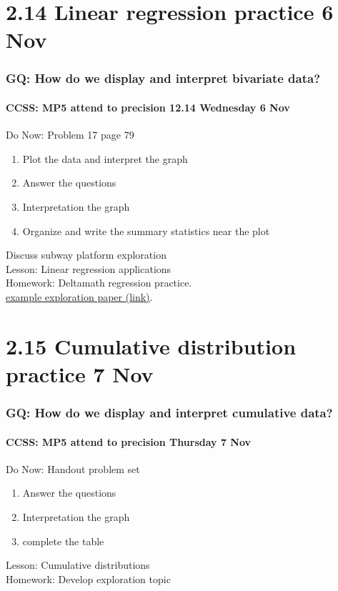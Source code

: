 \documentclass{beamer}
\begin{document}
\section{2.14 Linear regression practice 6 Nov}
\frame
{
  \frametitle{GQ: How do we display and interpret bivariate data?}
  \framesubtitle{CCSS: MP5 attend to precision \hfill \alert{12.14 Wednesday 6 Nov}}

  \begin{block}{Do Now: Problem 17 page 79}
  \begin{enumerate}
    \item Plot the data and interpret the graph 
    \item Answer the questions
    \item Interpretation the graph
    \item Organize and write the summary statistics near the plot
  \end{enumerate}
  \end{block}
  Discuss subway platform exploration \\ \smallskip
  Lesson: Linear regression applications\\ \smallskip
  Homework: Deltamath regression practice. \\ 
  \href{https://docs.google.com/viewer?a=v&pid=sites&srcid=ZGVmYXVsdGRvbWFpbnxodXNvbmJlY2F8Z3g6NzRkYjQ2MzQ5MDNmMDUxMA}
{example exploration paper (link)}. 
}

\section{2.15 Cumulative distribution practice 7 Nov}
\frame
{
  \frametitle{GQ: How do we display and interpret cumulative data?}
  \framesubtitle{CCSS: MP5 attend to precision \hfill \alert{Thursday 7 Nov}}

  \begin{block}{Do Now: Handout problem set}
  \begin{enumerate}
      \item Answer the questions 
      \item Interpretation the graph
      \item complete the table
  \end{enumerate}
  \end{block}
  Lesson: Cumulative distributions\\ \smallskip
  Homework: Develop exploration topic
}
\end{document}
